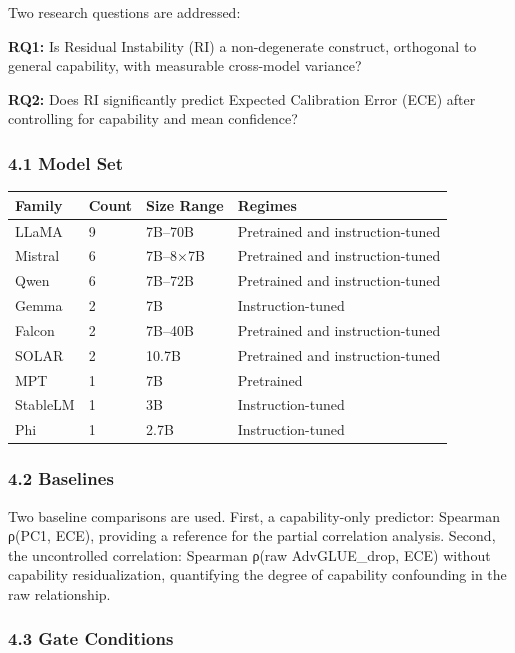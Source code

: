 
Two research questions are addressed:

\textbf{RQ1:} Is Residual Instability (RI) a non-degenerate construct, orthogonal to general capability, with measurable cross-model variance?

\textbf{RQ2:} Does RI significantly predict Expected Calibration Error (ECE) after controlling for capability and mean confidence?

\subsubsection{4.1 Model Set}

\begin{table}[htbp]
\centering
\begin{tabular}{llll}
\toprule
Family & Count & Size Range & Regimes \\
\midrule
LLaMA & 9 & 7B–70B & Pretrained and instruction-tuned \\
Mistral & 6 & 7B–8×7B & Pretrained and instruction-tuned \\
Qwen & 6 & 7B–72B & Pretrained and instruction-tuned \\
Gemma & 2 & 7B & Instruction-tuned \\
Falcon & 2 & 7B–40B & Pretrained and instruction-tuned \\
SOLAR & 2 & 10.7B & Pretrained and instruction-tuned \\
MPT & 1 & 7B & Pretrained \\
StableLM & 1 & 3B & Instruction-tuned \\
Phi & 1 & 2.7B & Instruction-tuned \\
\bottomrule
\end{tabular}
\end{table}

\subsubsection{4.2 Baselines}

Two baseline comparisons are used. First, a capability-only predictor: Spearman ρ(PC1, ECE), providing a reference for the partial correlation analysis. Second, the uncontrolled correlation: Spearman ρ(raw AdvGLUE_drop, ECE) without capability residualization, quantifying the degree of capability confounding in the raw relationship.

\subsubsection{4.3 Gate Conditions}

